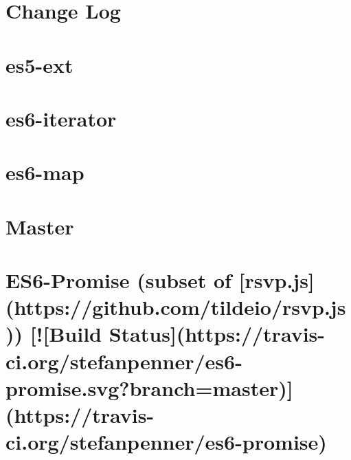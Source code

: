 \documentclass[twoside]{book}
\newcommand{\+}{\discretionary{\mbox{\scriptsize$\hookleftarrow$}}{}{}}
\begin{document}
\chapter{Change Log}
\label{md__c_1_workspace_demo_src_main_script_node_modules_es5-ext__c_h_a_n_g_e_l_o_g}

\chapter{es5-\/ext}
\label{md__c_1_workspace_demo_src_main_script_node_modules_es5-ext__r_e_a_d_m_e}

\chapter{es6-\/iterator}
\label{md__c_1_workspace_demo_src_main_script_node_modules_es6-iterator__r_e_a_d_m_e}

\chapter{es6-\/map}
\label{md__c_1_workspace_demo_src_main_script_node_modules_es6-map__r_e_a_d_m_e}

\chapter{Master}
\label{md__c_1_workspace_demo_src_main_script_node_modules_es6-promise__c_h_a_n_g_e_l_o_g}

\chapter{E\+S6-\/\+Promise (subset of \mbox{[}rsvp.\+js\mbox{]}(https\+://github.com/tildeio/rsvp.js)) \mbox{[}!\mbox{[}Build Status\mbox{]}(https\+://travis-\/ci.org/stefanpenner/es6-\/promise.svg?branch=master)\mbox{]}(https\+://travis-\/ci.org/stefanpenner/es6-\/promise)}
\label{md__c_1_workspace_demo_src_main_script_node_modules_es6-promise__r_e_a_d_m_e}

\end{document}
